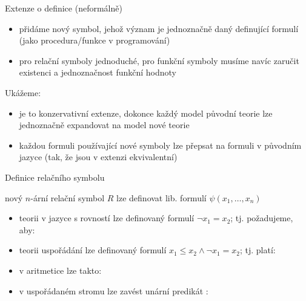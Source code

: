 \documentclass{beamer}
\begin{document}
\begin{frame}{Extenze o definice (neformálně)}

    \begin{itemize}
        \item přidáme nový symbol, jehož význam je jednoznačně daný \alert{definující formulí} (jako procedura/funkce v programování)
        \item pro relační symboly jednoduché, pro funkční symboly musíme navíc zaručit \alert{existenci} a \alert{jednoznačnost} funkční hodnoty
    \end{itemize}

    Ukážeme:
    \begin{itemize}
        \item je to konzervativní extenze, dokonce každý model původní teorie lze \alert{jednoznačně} expandovat na model nové teorie
        \item každou formuli používající nové symboly lze přepsat na  formuli v původním jazyce (tak, že jsou v extenzi ekvivalentní)
    \end{itemize}

\end{frame}



\begin{frame}{Definice relačního symbolu}
    
    nový $n$-ární relační symbol $R$ lze definovat lib. formulí $\psi(x_1,\dots,x_n)$

    \begin{itemize}
        \item teorii v jazyce s rovností lze  \alert{definovaný} formulí \alert{$\neg x_1=x_2$}; tj. požadujeme, aby:
        \item teorii uspořádání lze  definovaný formulí \alert{$x_1\leq x_2\land \neg x_1=x_2$}; tj. platí:
        \item v aritmetice lze  takto:
        \item v uspořádaném stromu lze zavést unární predikát :
    \end{itemize}

    \medskip


\end{frame}
\end{document}
